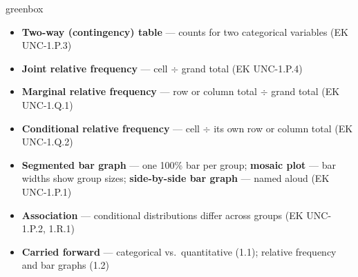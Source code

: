 \documentclass[10pt]{article}
\begin{document}
\boxguard
\begin{skillbox}{greenbox}
\begin{minipage}[t]{0.48\linewidth}
    \begin{itemize}
        \item \textbf{Two-way (contingency) table} --- counts for two categorical variables
              (EK UNC-1.P.3)
        \item \textbf{Joint relative frequency} --- cell $\div$ grand total (EK UNC-1.P.4)
        \item \textbf{Marginal relative frequency} --- row or column total $\div$ grand total
              (EK UNC-1.Q.1)
        \item \textbf{Conditional relative frequency} --- cell $\div$ its own row or column
              total (EK UNC-1.Q.2)
    \end{itemize}
\end{minipage}
\hfill
\begin{minipage}[t]{0.48\linewidth}
    \begin{itemize}
        \item \textbf{Segmented bar graph} --- one 100\% bar per group; \textbf{mosaic plot}
              --- bar widths show group sizes; \textbf{side-by-side bar graph} --- named
              aloud (EK UNC-1.P.1)
        \item \textbf{Association} --- conditional distributions differ across groups
              (EK UNC-1.P.2, 1.R.1)
        \item \textbf{Carried forward} --- categorical vs.\ quantitative (1.1); relative
              frequency and bar graphs (1.2)
    \end{itemize}
\end{minipage}
\end{skillbox}
\end{document}
